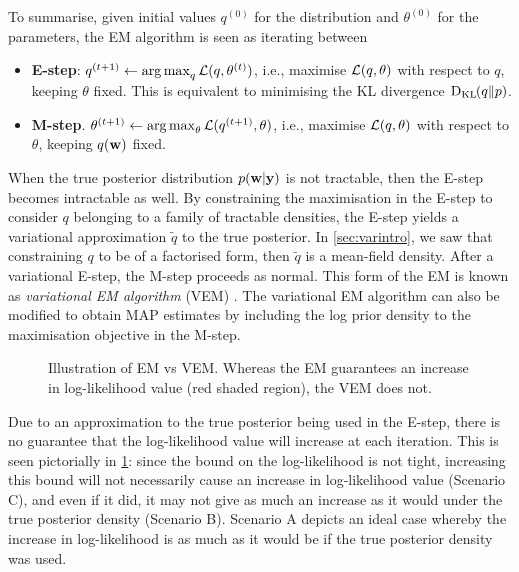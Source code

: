 To summarise, given initial values $q^{(0)}$ for the distribution  and $\theta^{(0)}$ for the parameters, the EM algorithm is seen as iterating between
\begin{itemize}
  \item \textbf{E-step}: $q^{(t+1)} \gets \operatorname*{arg\,max}_q {\mathcal L}(q,\theta^{(t)})$, i.e., maximise ${\mathcal L}(q,\theta)$ with respect to $q$, keeping $\theta$ fixed. This is equivalent to minimising the KL divergence $\operatorname{D_{KL}\hspace{-1pt}}(q\Vert p)$.
  \item \textbf{M-step}. $\theta^{(t+1)} \gets \operatorname*{arg\,max}_\theta {\mathcal L}(q^{(t+1)},\theta)$, i.e., maximise ${\mathcal L}(q,\theta)$ with respect to $\theta$, keeping $q({\mathbf w})$ fixed.
\end{itemize}

When the true posterior distribution $p({\mathbf w}|{\mathbf y})$ is not tractable, then the E-step becomes intractable as well.
By constraining the maximisation in the E-step to consider $q$ belonging to a family of tractable densities, the E-step yields a variational approximation $\tilde q$ to the true posterior.
In \cref{sec:varintro}, we saw that constraining $q$ to be of a factorised form, then $\tilde q$ is a mean-field density.
After a variational E-step, the M-step proceeds as normal.
This form of the EM is known as \emph{variational EM algorithm} (VEM) \citep{beal2003variational}.
The variational EM algorithm can also be modified to obtain MAP estimates by including the log prior density to the maximisation objective in the M-step.

\begin{figure}[p]\label{fig:emVSvem}
  \centering
  \energyemEstep \hspace{0.5cm}
  \energyvbEstep
  \energyemMstep \hspace{0.5cm}
  \energyvbMstepa
  \energyemMstepfade \hspace{0.5cm}
  \energyvbMstepb
  \energyemMstepfade \hspace{0.5cm}
  \energyvbMstepc
  \vspace{-1em} 
  \caption{Illustration of EM vs VEM. Whereas the EM guarantees an increase in log-likelihood value (red shaded region), the VEM does not.}
\end{figure}

Due to an approximation to the true posterior being used in the E-step, there is no guarantee that the log-likelihood value will increase at each iteration.
This is seen pictorially in \cref{fig:emVSvem}: since the bound on the log-likelihood is not tight, increasing this bound will not necessarily cause an increase in log-likelihood value (Scenario C), and even if it did, it may not give as much an increase as it would under the true posterior density (Scenario B).
Scenario A depicts an ideal case whereby the increase in log-likelihood is as much as it would be if the true posterior density was used.

